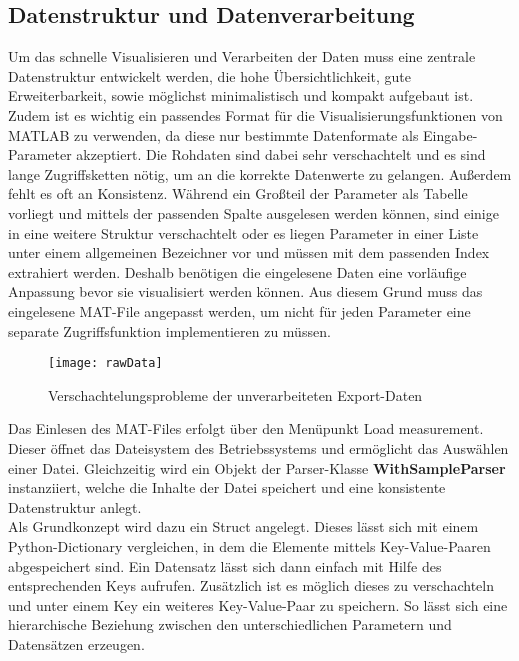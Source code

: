 \subsection{Datenstruktur und Datenverarbeitung}

Um das schnelle Visualisieren und Verarbeiten der Daten muss eine zentrale Datenstruktur entwickelt werden, die hohe Übersichtlichkeit, gute Erweiterbarkeit, sowie möglichst minimalistisch und kompakt aufgebaut ist. Zudem ist es wichtig ein passendes Format für die Visualisierungsfunktionen von MATLAB zu verwenden, da diese nur bestimmte Datenformate als Eingabe-Parameter akzeptiert. Die Rohdaten sind dabei sehr verschachtelt und es sind lange Zugriffsketten nötig, um an die korrekte Datenwerte zu gelangen. Außerdem fehlt es oft an Konsistenz. Während ein Großteil der Parameter als Tabelle vorliegt und mittels der passenden Spalte ausgelesen werden können, sind einige in eine weitere Struktur verschachtelt oder es liegen Parameter in einer Liste unter einem allgemeinen Bezeichner vor und müssen mit dem passenden Index extrahiert werden. Deshalb benötigen die eingelesene Daten eine vorläufige Anpassung bevor sie visualisiert werden können. Aus diesem Grund muss das eingelesene MAT-File angepasst werden, um nicht für jeden Parameter eine separate Zugriffsfunktion implementieren zu müssen.

\begin{figure}[H]
	\centering
	\texttt{[image: rawData]}
	\caption{Verschachtelungsprobleme der unverarbeiteten Export-Daten}
	\label{fig:rawData}
\end{figure}

Das Einlesen des MAT-Files erfolgt über den Menüpunkt \glqq Load measurement\grqq{}. Dieser öffnet das Dateisystem des Betriebssystems und ermöglicht das Auswählen einer Datei. Gleichzeitig wird ein Objekt der Parser-Klasse \textbf{WithSampleParser} instanziiert, welche die Inhalte der Datei speichert und eine konsistente Datenstruktur anlegt.\\
Als Grundkonzept wird dazu ein Struct angelegt. Dieses lässt sich mit einem Python-Dictionary vergleichen, in dem die Elemente mittels Key-Value-Paaren abgespeichert sind. Ein Datensatz lässt sich dann einfach mit Hilfe des entsprechenden Keys aufrufen. Zusätzlich ist es möglich dieses zu verschachteln und unter einem Key ein weiteres Key-Value-Paar zu speichern. So lässt sich eine hierarchische Beziehung zwischen den unterschiedlichen Parametern und Datensätzen erzeugen.

